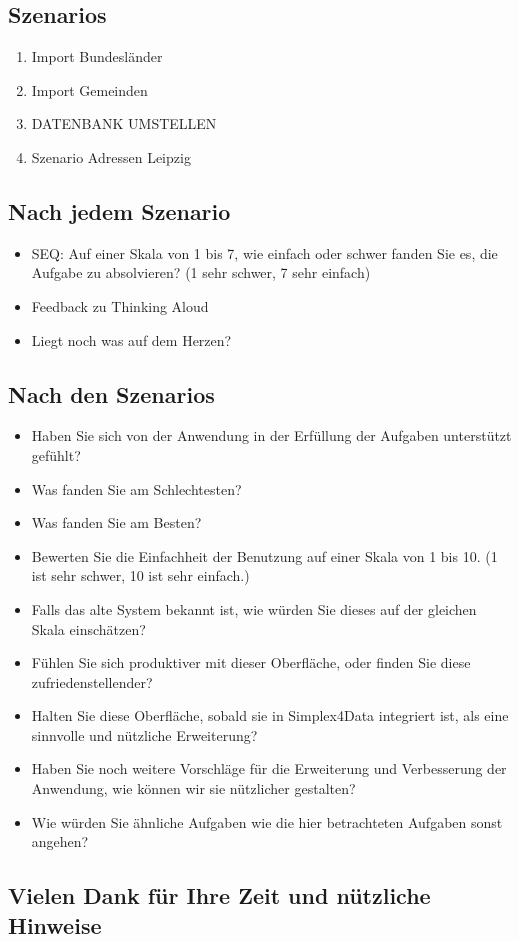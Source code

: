 \subsection*{Szenarios}
\footnotesize{
  \begin{enumerate}
    \item Import Bundesländer
    \item Import Gemeinden
    \item[] DATENBANK UMSTELLEN
    \item Szenario Adressen Leipzig
  \end{enumerate}
}

\subsection*{Nach jedem Szenario}
\begin{itemize}
  \item SEQ: Auf einer Skala von 1 bis 7, wie einfach oder schwer fanden Sie es, die Aufgabe zu
        absolvieren? (1 sehr schwer, 7 sehr einfach)
  \item Feedback zu Thinking Aloud
  \item Liegt noch was auf dem Herzen?
\end{itemize}

\subsection*{Nach den Szenarios}
\begin{itemize}
  \item Haben Sie sich von der Anwendung in der Erfüllung der Aufgaben unterstützt gefühlt?
  \item Was fanden Sie am Schlechtesten?
  \item Was fanden Sie am Besten?
  \item Bewerten Sie die Einfachheit der Benutzung auf einer Skala von 1 bis 10. (1 ist sehr schwer,
        10 ist sehr einfach.)
  \item Falls das alte System bekannt ist, wie würden Sie dieses auf der gleichen Skala einschätzen?
  \item Fühlen Sie sich produktiver mit dieser Oberfläche, oder finden Sie diese zufriedenstellender?
  \item Halten Sie diese Oberfläche, sobald sie in Simplex4Data integriert ist, als eine sinnvolle
        und nützliche Erweiterung?
  \item Haben Sie noch weitere Vorschläge für die Erweiterung und Verbesserung der Anwendung, wie
        können wir sie nützlicher gestalten?
  \item Wie würden Sie ähnliche Aufgaben wie die hier betrachteten Aufgaben sonst angehen?
\end{itemize}

\subsection*{Vielen Dank für Ihre Zeit und nützliche Hinweise}
